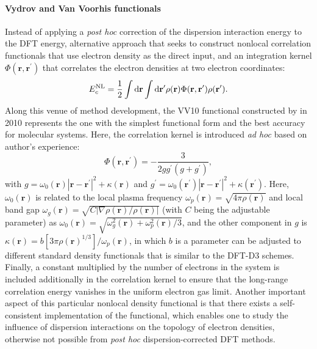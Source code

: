 \paragraph{V\textbf{ydrov and Van Voorhis functionals}} Instead of applying a \emph{post hoc} correction of the dispersion interaction energy to the DFT energy, alternative approach that seeks to construct nonlocal correlation functionals that use electron density as the direct input, and an integration kernel $\Phi(\bm{r},\bm{r}^\prime)$ that correlates the electron densities at two electron coordinates:
\begin{equation}\label{eq:nonlocal_disp_corr_kernel}
E_{c}^{\mbox{\scriptsize{NL}}}=\frac{1}{2}\int \mbox{d}\mathbf{r} \int \mbox{d}\mathbf{r}^\prime\rho(\mathbf{r})\Phi(\mathbf{r},\mathbf{r}^\prime) \rho(\mathbf{r}^\prime) .
\end{equation}
Along this venue of method development,\cite{grafenstein2009efficient,dion2004van,lee2010higher,vydrov2009improving,vydrov2009nonlocal,vydrov2010nonlocal} the VV10 functional constructed by \citet{vydrov2010nonlocal} in 2010 represents the one with the simplest functional form and the best accuracy for molecular systems. Here, the correlation kernel is introduced \emph{ad hoc} based on author's experience:
\begin{equation}\label{eq:vv10_kernel}
\Phi(\bm{r},\bm{r}^\prime)=-\frac{3}{2gg^\prime(g+g^\prime)}, 
\end{equation}
with $g=\omega_0(\bm{r})|\bm{r}-\bm{r}^\prime|^2+\kappa(\bm{r})$ and $g^\prime=\omega_0(\bm{r}^\prime)|\bm{r}-\bm{r}^\prime|^2+\kappa(\bm{r}^\prime)$. Here, $\omega_0(\bm{r})$ is related to the local plasma frequency  $\omega_p
(\bm{r})=\sqrt{4\pi\rho(\bm{r})}$ and local band gap $\omega_g(\bm{r})=\sqrt{C\left\vert\nabla \rho(\bm{r})/\rho(\bm{r})\right\vert}$ 
(with $C$ being the adjustable parameter) as $\omega_0(\bm{r})=\sqrt{\omega_g^2(\bm{r})+\omega_p^{2}(\bm{r})/3}$, and the other component in $g$ is $\kappa(\bm{r})=b[3\pi\rho(\bm{r})^{1/3}]/\omega_{p}(\bm{r})$, in which $b$ is a parameter can be adjusted\cite{hujo2011performance} to different standard density functionals that is similar to the DFT-D3 schemes. Finally, a constant multiplied by the number of electrons in the system is included additionally in the correlation kernel to ensure that the long-range correlation energy vanishes in the uniform electron gas limit. Another important aspect of this particular nonlocal density functional is that there exists a self-consistent implementation of the functional,\cite{vydrov2010implementation} which enables one to study the influence of dispersion interactions on the topology of  electron  densities, otherwise not possible from \emph{post hoc} dispersion-corrected DFT methods.